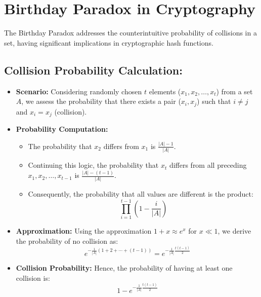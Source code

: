 \documentclass[12pt]{article}
\begin{document}
\section*{Birthday Paradox in Cryptography}

The Birthday Paradox addresses the counterintuitive probability of collisions in a set, having significant implications in cryptographic hash functions.

\subsection*{Collision Probability Calculation:}
\begin{itemize}
    \item \textbf{Scenario:} Considering randomly chosen \( t \) elements (\( x_1, x_2, \ldots, x_t \)) from a set \( A \), we assess the probability that there exists a pair (\( x_i, x_j \)) such that \( i \neq j \) and \( x_i = x_j \) (collision).
    \item \textbf{Probability Computation:} 
    \begin{itemize}
        \item The probability that \( x_2 \) differs from \( x_1 \) is \( \frac{|A|-1}{|A|} \).
        \item Continuing this logic, the probability that \( x_t \) differs from all preceding \( x_1, x_2, \ldots, x_{t-1} \) is \( \frac{|A|-(t-1)}{|A|} \).
        \item Consequently, the probability that all values are different is the product:
        \[
        \prod_{i=1}^{t-1} \left(1 - \frac{i}{|A|}\right)
        \]
    \end{itemize}
    \item \textbf{Approximation:} Using the approximation \( 1 + x \approx e^x \) for \( x \ll 1 \), we derive the probability of no collision as:
    \[
    e^{-\frac{1}{|A|}(1 + 2 + \cdots + (t-1))} = e^{-\frac{1}{|A|} \frac{t(t-1)}{2}}
    \]
    \item \textbf{Collision Probability:} Hence, the probability of having at least one collision is:
    \[
    1 - e^{-\frac{1}{|A|} \frac{t(t-1)}{2}}
    \]
\end{itemize}
\end{document}
